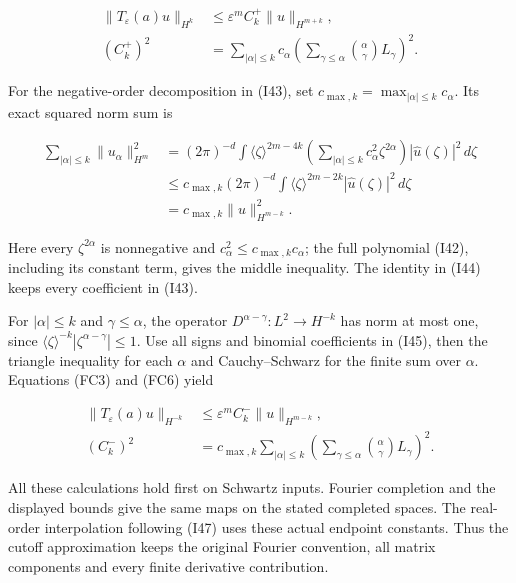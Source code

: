 \documentclass[
  11pt,
]{article}
\begin{document}
\[
 \begin{aligned}
 \|T_\varepsilon(a)u\|_{H^k}
 &\leq \varepsilon^m C_k^+\|u\|_{H^{m+k}},\\
 (C_k^+)^2
 &=\sum_{|\alpha|\leq k}c_\alpha
       \left(\sum_{\gamma\leq\alpha}
              {\alpha\choose\gamma}L_\gamma\right)^2.
 \end{aligned}
 \tag{FC5}
\]

For the negative-order decomposition in (I43), set
\(c_{\max,k}=\max_{|\alpha|\leq k}c_\alpha\). Its exact squared norm sum
is

\[
 \begin{aligned}
 \sum_{|\alpha|\leq k}\|u_\alpha\|_{H^m}^2
 &=(2\pi)^{-d}\int\langle\zeta\rangle^{2m-4k}
       \left(\sum_{|\alpha|\leq k}c_\alpha^2\zeta^{2\alpha}\right)
                        |\widehat u(\zeta)|^2\,d\zeta\\
 &\leq c_{\max,k}(2\pi)^{-d}\int
       \langle\zeta\rangle^{2m-2k}|\widehat u(\zeta)|^2\,d\zeta\\
 &=c_{\max,k}\|u\|_{H^{m-k}}^2.
 \end{aligned}
 \tag{FC6}
\]

Here every \(\zeta^{2\alpha}\) is nonnegative and
\(c_\alpha^2\leq c_{\max,k}c_\alpha\); the full polynomial (I42),
including its constant term, gives the middle inequality. The identity
in (I44) keeps every coefficient in (I43).

For \(|\alpha|\leq k\) and \(\gamma\leq\alpha\), the operator
\(D^{\alpha-\gamma}:L^2\to H^{-k}\) has norm at most one, since
\(\langle\zeta\rangle^{-k}|\zeta^{\alpha-\gamma}|\leq1\). Use all signs
and binomial coefficients in (I45), then the triangle inequality for
each \(\alpha\) and Cauchy--Schwarz for the finite sum over \(\alpha\).
Equations (FC3) and (FC6) yield

\[
 \begin{aligned}
 \|T_\varepsilon(a)u\|_{H^{-k}}
 &\leq \varepsilon^m C_k^-\|u\|_{H^{m-k}},\\
 (C_k^-)^2
 &=c_{\max,k}\sum_{|\alpha|\leq k}
       \left(\sum_{\gamma\leq\alpha}
                 {\alpha\choose\gamma}L_\gamma\right)^2.
 \end{aligned}
 \tag{FC7}
\]

All these calculations hold first on Schwartz inputs. Fourier completion
and the displayed bounds give the same maps on the stated completed
spaces. The real-order interpolation following (I47) uses these actual
endpoint constants. Thus the cutoff approximation keeps the original
Fourier convention, all matrix components and every finite derivative
contribution.
\end{document}
